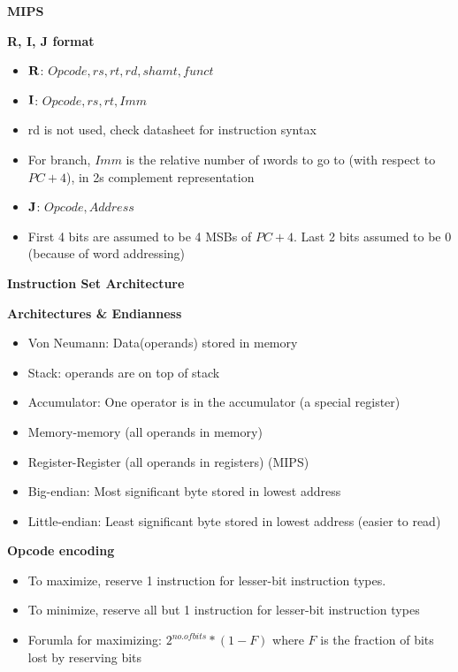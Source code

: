 \documentclass[a4paper]{article} \usepackage[backend=biber, style=numeric, sorting=none]{biblatex}
\begin{document}
\begin{multicols*}{4}
{\small\textbf{MIPS}}

\textbf{R, I, J format}
\begin{itemize}[leftmargin=*]
\itemsep -0.5em
\item $\bf{R}$: $Opcode, rs, rt, rd, shamt, funct$
\item $\bf{I}$: $Opcode, rs, rt, Imm$
\item rd is not used, check datasheet for instruction syntax
\item For branch, $Imm$ is the relative number of \i{words} to go to (with respect to $PC + 4$), in 2s complement representation
\item $\bf{J}$: $Opcode, Address$
\item First 4 bits are assumed to be 4 MSBs of $PC + 4$. Last 2 bits assumed to be 0 (because of word addressing)
\end{itemize}

{\small\textbf{Instruction Set Architecture}}

\textbf{Architectures \& Endianness}
\begin{itemize}[leftmargin=*]
\itemsep -0.5em
\item Von Neumann: Data(operands) stored in memory
\item Stack: operands are on top of stack
\item Accumulator: One operator is in the accumulator (a special register)
\item Memory-memory (all operands in memory)
\item Register-Register (all operands in registers) (MIPS)
\item Big-endian: Most significant byte stored in lowest address
\item Little-endian: Least significant byte stored in lowest address (easier to read)
\end{itemize}

\textbf{Opcode encoding}
\begin{itemize}[leftmargin=*]
\itemsep -0.5em
\item To maximize, reserve 1 instruction for lesser-bit instruction types.
\item To minimize, reserve all but 1 instruction for lesser-bit instruction types
\item Forumla for maximizing: $2^{no. of bits} * (1 - F)$ where $F$ is the fraction of bits lost by reserving bits
\end{itemize}


\end{multicols*}
\end{document}
